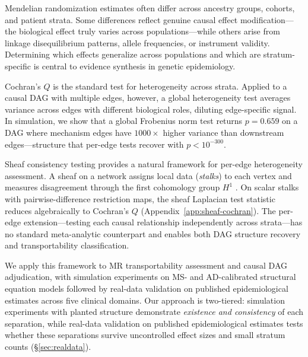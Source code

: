 \documentclass[11pt]{article}
\begin{document}
Mendelian randomization estimates often differ across ancestry groups, cohorts, and patient strata.
Some differences reflect genuine causal effect modification---the biological effect truly varies across populations---while others arise from linkage disequilibrium patterns, allele frequencies, or instrument validity.
Determining which effects generalize across populations and which are stratum-specific is central to evidence synthesis in genetic epidemiology.

Cochran's $Q$ is the standard test for heterogeneity across strata.
Applied to a causal DAG with multiple edges, however, a global heterogeneity test averages variance across edges with different biological roles, diluting edge-specific signal.
In simulation, we show that a global Frobenius norm test returns $p = 0.659$ on a DAG where mechanism edges have $1000\times$ higher variance than downstream edges---structure that per-edge tests recover with $p < 10^{-300}$.

Sheaf consistency testing provides a natural framework for per-edge heterogeneity assessment.
A sheaf on a network assigns local data (\emph{stalks}) to each vertex and measures disagreement through the first cohomology group $H^1$ \citep{robinson2014topological, curry2014sheaves}.
On scalar stalks with pairwise-difference restriction maps, the sheaf Laplacian test statistic reduces algebraically to Cochran's $Q$ (Appendix~\ref{app:sheaf-cochran}).
The per-edge extension---testing each causal relationship independently across strata---has no standard meta-analytic counterpart and enables both DAG structure recovery and transportability classification.

We apply this framework to MR transportability assessment and causal DAG adjudication, with simulation experiments on MS- and AD-calibrated structural equation models followed by real-data validation on published epidemiological estimates across five clinical domains.
Our approach is two-tiered: simulation experiments with planted structure demonstrate \emph{existence and consistency} of each separation, while real-data validation on published epidemiological estimates tests whether these separations survive uncontrolled effect sizes and small stratum counts (\S\ref{sec:realdata}).
\end{document}
